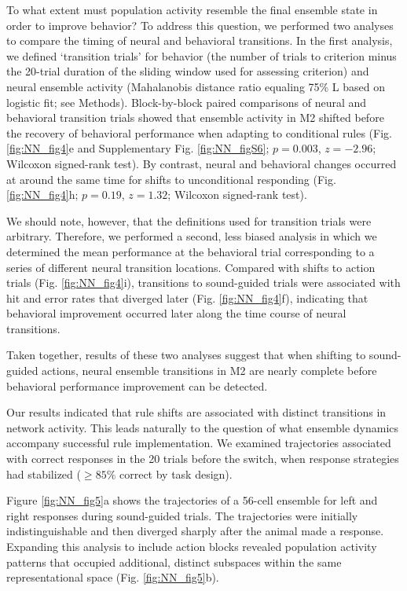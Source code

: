 To what extent must population activity resemble the final ensemble state in order to improve behavior? To address this question, we performed two analyses to compare the timing of neural and behavioral transitions. In the first analysis, we defined `transition trials' for behavior (the number of trials to criterion minus the 20-trial duration of the sliding window used for assessing criterion) and neural ensemble activity (Mahalanobis distance ratio equaling 75\% L based on logistic fit; see Methods). Block-by-block paired comparisons of neural and behavioral transition trials showed that ensemble activity in M2 shifted before the recovery of behavioral performance when adapting to conditional rules (Fig. \ref{fig:NN_fig4}e and Supplementary Fig. \ref{fig:NN_figS6}; $p = 0.003$, $z = -2.96$; Wilcoxon signed-rank test). By contrast, neural and behavioral changes occurred at around the same time for shifts to unconditional responding (Fig. \ref{fig:NN_fig4}h; $p = 0.19$, $z = 1.32$; Wilcoxon signed-rank test). 

We should note, however, that the definitions used for transition trials were arbitrary. Therefore, we performed a second, less biased analysis in which we determined the mean performance at the behavioral trial corresponding to a series of different neural transition locations. Compared with shifts to action trials (Fig. \ref{fig:NN_fig4}i), transitions to sound-guided trials were associated with hit and error rates that diverged later (Fig. \ref{fig:NN_fig4}f), indicating that behavioral improvement occurred later along the time course of neural transitions. 

Taken together, results of these two analyses suggest that when shifting to sound-guided actions, neural ensemble transitions in M2 are nearly complete before behavioral performance improvement can be detected.

Our results indicated that rule shifts are associated with distinct transitions in network activity. This leads naturally to the question of what ensemble dynamics accompany successful rule implementation. We examined trajectories associated with correct responses in the 20 trials before the switch, when response strategies had stabilized ($\ge 85\%$ correct by task design). 

Figure \ref{fig:NN_fig5}a shows the trajectories of a 56-cell ensemble for left and right responses during sound-guided trials. The trajectories were initially indistinguishable and then diverged sharply after the animal made a response. Expanding this analysis to include action blocks revealed population activity patterns that occupied additional, distinct subspaces within the same representational space (Fig. \ref{fig:NN_fig5}b).


